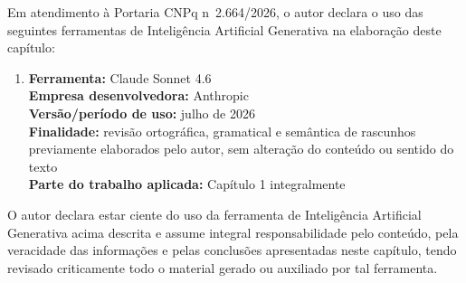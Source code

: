 Em atendimento à Portaria CNPq n\textordmasculine\ 2.664/2026, o autor declara o uso das seguintes ferramentas de Inteligência Artificial Generativa na elaboração deste capítulo:

\begin{enumerate}
    \item \textbf{Ferramenta:} Claude Sonnet 4.6 \\
    \textbf{Empresa desenvolvedora:} Anthropic \\
    \textbf{Versão/período de uso:} julho de 2026 \\
    \textbf{Finalidade:} revisão ortográfica, gramatical e semântica de rascunhos previamente elaborados pelo autor, sem alteração do conteúdo ou sentido do texto \\
    \textbf{Parte do trabalho aplicada:} Capítulo 1 integralmente
\end{enumerate}

O autor declara estar ciente do uso da ferramenta de Inteligência Artificial Generativa acima descrita e assume integral responsabilidade pelo conteúdo, pela veracidade das informações e pelas conclusões apresentadas neste capítulo, tendo revisado criticamente todo o material gerado ou auxiliado por tal ferramenta.
